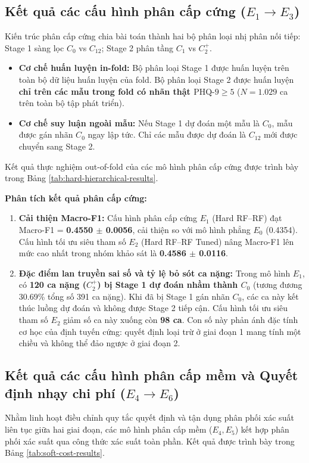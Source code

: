 \subsection{Kết quả các cấu hình phân cấp cứng ($E_1 \to E_3$)}
Kiến trúc phân cấp cứng chia bài toán thành hai bộ phân loại nhị phân nối tiếp: Stage 1 sàng lọc $C_0$ vs $C_{12}$; Stage 2 phân tầng $C_1$ vs $C_2^+$.
\begin{itemize}
    \item \textbf{Cơ chế huấn luyện in-fold:} Bộ phân loại Stage 1 được huấn luyện trên toàn bộ dữ liệu huấn luyện của fold. Bộ phân loại Stage 2 được huấn luyện \textbf{chỉ trên các mẫu trong fold có nhãn thật $\text{PHQ-9} \ge 5$} ($N = 1.029$ ca trên toàn bộ tập phát triển).
    \item \textbf{Cơ chế suy luận ngoài mẫu:} Nếu Stage 1 dự đoán một mẫu là $C_0$, mẫu được gán nhãn $C_0$ ngay lập tức. Chỉ các mẫu được dự đoán là $C_{12}$ mới được chuyển sang Stage 2.
\end{itemize}

Kết quả thực nghiệm out-of-fold của các mô hình phân cấp cứng được trình bày trong Bảng \ref{tab:hard-hierarchical-results}.



\textbf{Phân tích kết quả phân cấp cứng:}
\begin{enumerate}
    \item \textbf{Cải thiện Macro-F1:} Cấu hình phân cấp cứng $E_1$ (Hard RF--RF) đạt Macro-F1 = \textbf{0.4550 $\pm$ 0.0056}, cải thiện so với mô hình phẳng $E_0$ (0.4354). Cấu hình tối ưu siêu tham số $E_2$ (Hard RF--RF Tuned) nâng Macro-F1 lên mức cao nhất trong nhóm khảo sát là \textbf{0.4586 $\pm$ 0.0116}.
    \item \textbf{Đặc điểm lan truyền sai số và tỷ lệ bỏ sót ca nặng:} Trong mô hình $E_1$, có \textbf{120 ca nặng ($C_2^+$) bị Stage 1 dự đoán nhầm thành $C_0$} (tương đương 30.69\% tổng số 391 ca nặng). Khi đã bị Stage 1 gán nhãn $C_0$, các ca này kết thúc luồng dự đoán và không được Stage 2 tiếp cận. Cấu hình tối ưu siêu tham số $E_2$ giảm số ca này xuống còn \textbf{98 ca}. Con số này phản ánh đặc tính cơ học của định tuyến cứng: quyết định loại trừ ở giai đoạn 1 mang tính một chiều và không thể đảo ngược ở giai đoạn 2.
\end{enumerate}

\subsection{Kết quả các cấu hình phân cấp mềm và Quyết định nhạy chi phí ($E_4 \to E_6$)}
Nhằm linh hoạt điều chỉnh quy tắc quyết định và tận dụng phân phối xác suất liên tục giữa hai giai đoạn, các mô hình phân cấp mềm ($E_4, E_5$) kết hợp phân phối xác suất qua công thức xác suất toàn phần. Kết quả được trình bày trong Bảng \ref{tab:soft-cost-results}.

